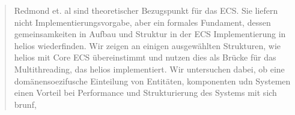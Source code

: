 \begin{abstract}
Redmond et. al sind theoretischer Bezugspunkt für das ECS. Sie liefern nicht Implementierungsvorgabe, aber ein formales Fundament, dessen gemeinsamkeiten in  Aufbau und Struktur in  der ECS Implementierung in helios wiederfinden.
    Wir zeigen an einigen ausgewählten Strukturen, wie helios mit Core ECS übereinstimmt und nutzen dies als Brücke für das Multithreading,
das helios implementiert. Wir untersuchen dabei, ob eine domänensoezifusche Einteilung von Entitäten, komponenten udn Systemen einen Vorteil bei Performance und Strukturierung des Systems mit sich brunf,
\end{abstract}



